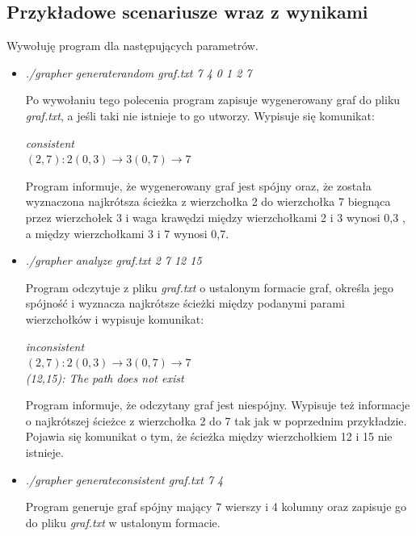 \documentclass{article}
\begin{document}
\subsection{Przykładowe scenariusze wraz z wynikami}
Wywołuję program dla następujących parametrów.
\begin{itemize}
\item\textit{./grapher generate\textunderscore random graf.txt 7 4 0 1 2 7}

\medskip

Po wywołaniu tego polecenia program zapisuje wygenerowany graf do pliku \emph{graf.txt}, a jeśli taki nie istnieje to go utworzy. Wypisuje się komunikat: 

\medskip

\textit{consistent}\\
$(2,7): 2(0,3) \rightarrow 3(0,7) \rightarrow 7$

\medskip

Program informuje, że wygenerowany graf jest spójny oraz, że została wyznaczona najkrótsza ścieżka z wierzchołka 2 do wierzchołka 7 biegnąca przez wierzchołek 3 i waga krawędzi między wierzchołkami 2 i 3 wynosi 0,3 , a między wierzchołkami 3 i 7 wynosi 0,7.
\item \textit{./grapher analyze graf.txt 2 7 12 15}

\medskip

Program odczytuje z pliku \emph{graf.txt} o ustalonym formacie graf, określa jego spójność i wyznacza najkrótsze ścieżki między podanymi parami wierzchołków i wypisuje komunikat:

\medskip

\textit{inconsistent}\\
$(2,7): 2(0,3) \rightarrow 3(0,7) \rightarrow 7$\\
\textit{(12,15): The path does not exist}

\medskip

Program informuje, że odczytany graf jest niespójny. Wypisuje też informacje o najkrótszej ścieżce z wierzchołka 2 do 7 tak jak w poprzednim przykładzie. Pojawia się komunikat o tym, że ścieżka między wierzchołkiem 12 i 15 nie istnieje.

\item \textit{./grapher generate\textunderscore consistent graf.txt 7 4}

\medskip

Program generuje graf spójny mający 7 wierszy i 4 kolumny oraz zapisuje go do pliku \emph{graf.txt} w ustalonym formacie.
\end{itemize}
\end{document}

